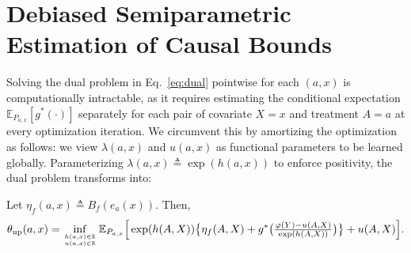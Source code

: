 \section{Debiased Semiparametric Estimation of Causal Bounds}\label{sec:5}
Solving the dual problem in Eq.~\eqref{eq:dual} pointwise for each $(a,x)$ is computationally intractable, as it requires estimating the conditional expectation $\mathbb{E}_{P_{a,x}}[g^{\ast}(\cdot)]$ separately for each pair of covariate $X=x$ and treatment $A=a$ at every optimization iteration. We circumvent this by amortizing the optimization as follows: we view $\lambda(a,x)$ and $u(a,x)$ as functional parameters to be learned globally. Parameterizing $\lambda(a,x) \triangleq \exp(h(a,x))$ to enforce positivity, the dual problem transforms into:
\begin{proposition}
    \normalfont 
    Let $\eta_f(a,x) \triangleq B_f(e_a(x))$. Then, 
    \begin{align}\label{eq:dual2}
        \theta_{\mathrm{up}}(a,x) = \inf_{h(a,x) \in \mathbb{R} \atop u(a,x) \in \mathbb{R}} \mathbb{E}_{P_{a,x}}\Big[ \exp({h(A,X)})\big\{\eta_f(A,X) + g^{\ast}\big( \tfrac{\varphi(Y) - u(A,X)}{\exp({h(A,X)})}\big) \big\}  + u(A,X)  \Big].
    \end{align}
\end{proposition}

